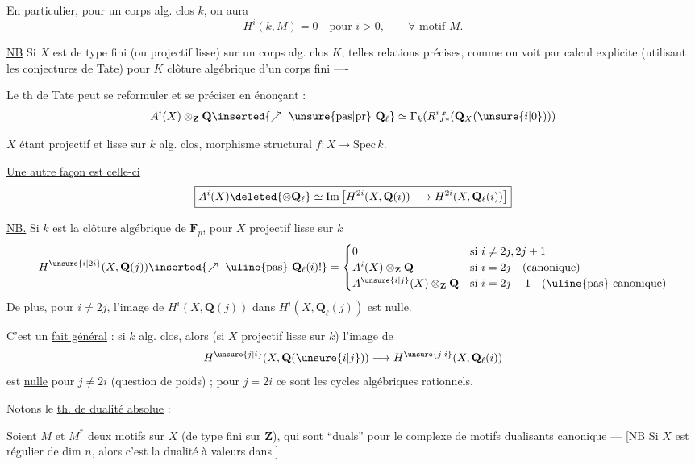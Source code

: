 En particulier, pour un corps alg. clos $k$, on aura
\[
H^i(k,M)=0\quad\text{pour }i>0,\qquad \forall\text{ motif }M.
\]

\uline{NB} Si $X$ est de type fini (ou projectif lisse) sur un corps alg. clos $K$,  telles relations précises, comme on voit par calcul explicite (utilisant les conjectures de Tate) pour $K$ clôture algébrique d'un corps fini ----

Le th de Tate peut se reformuler et se préciser en énonçant :
\[
A^i(X)\otimes_{\mathbf{Z}}\mathbf{Q}\inserted{\nearrow\ \unsure{\text{pas}|\text{pr}}\ \mathbf{Q}_\ell}\simeq \Gamma_k(R^i f_*(\mathbf{Q}_X(\unsure{i|0})))
\]

$X$ étant projectif et lisse sur $k$ alg. clos, morphisme structural $f:X\longrightarrow\mathrm{Spec}\,k$.

\uline{Une autre façon est celle-ci}
\[
\boxed{A^i(X)\deleted{\otimes\mathbf{Q}_\ell}\simeq\mathrm{Im}\left[H^{2i}(X,\mathbf{Q}(i))\longrightarrow H^{2i}(X,\mathbf{Q}_\ell(i))\right]}
\]

\uline{NB.} Si $k$ est la clôture algébrique de $\mathbf{F}_p$,  pour $X$ projectif lisse sur $k$
\[
H^{\unsure{i|2i}}(X,\mathbf{Q}(j))\inserted{\nearrow\ \uline{\text{pas}}\ \mathbf{Q}_\ell(i)!}=
\begin{cases}
0&\text{si }i\ne 2j,2j+1\\
A^i(X)\otimes_{\mathbf{Z}}\mathbf{Q}&\text{si }i=2j\quad\text{(canonique)}\\
A^{\unsure{i|j}}(X)\otimes_{\mathbf{Z}}\mathbf{Q}&\text{si }i=2j+1\quad\text{(\uline{pas} canonique)}
\end{cases}
\]
De plus, pour $i\ne 2j$, l'image de $H^i(X,\mathbf{Q}(j))$ dans $H^i(X,\mathbf{Q}_\ell(j))$ est nulle.

C'est un \uline{fait général} : si $k$ alg. clos, alors (si $X$ projectif lisse sur $k$) l'image de
\[
H^{\unsure{j|i}}(X,\mathbf{Q}(\unsure{i|j}))\longrightarrow H^{\unsure{j|i}}(X,\mathbf{Q}_\ell(i))
\]
est \uline{nulle} pour $j\ne 2i$ (question de poids) ; pour $j=2i$ ce sont les cycles algébriques  rationnels.

Notons le \uline{th. de dualité absolue} :

Soient $M$ et $M^*$ deux  motifs sur $X$ (de type fini sur $\mathbf{Z}$), qui sont ``duals'' pour le \deleted{$\unsure{[|\xi}$} complexe de motifs dualisants \deleted{$\unsure{]|\xi}$} canonique --- [NB Si $X$ est régulier  de dim $n$, alors c'est la dualité à valeurs dans ]

